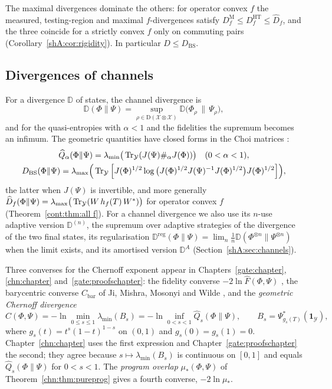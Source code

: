 The maximal divergences dominate the others: for operator convex $f$ the measured, testing-region and maximal $f$-divergences satisfy $D^{\mathrm M}_f\le D^{\mathrm{HT}}_f\le\widehat D_f$, and the three coincide for a strictly convex $f$ only on commuting pairs (Corollary~\ref{shA:cor:rigidity}). In particular $D\le D_{\mathrm{BS}}$.

\subsection*{Divergences of channels}
For a divergence $\mathbb D$ of states, the channel divergence is
\[
\mathbb D(\Phi\|\Psi)=\sup_{\rho\in\mathrm D(\mathcal X\otimes\mathcal X)}\mathbb D\big(\Phi_\rho\,\big\|\,\Psi_\rho\big),
\]
and for the quasi-entropies with $\alpha<1$ and the fidelities the supremum becomes an infimum. The geometric quantities have closed forms in the Choi matrices \cite{KatariyaWilde2021,FangFawzi2021}:
\begin{gather*}
\widehat Q_\alpha(\Phi\|\Psi)=\lambda_{\min}\big(\operatorname{Tr}_{\mathcal Y}(J(\Psi)\#_\alpha J(\Phi))\big)\quad(0<\alpha<1),\\
D_{\mathrm{BS}}(\Phi\|\Psi)=\lambda_{\max}\Big(\operatorname{Tr}_{\mathcal Y}\Big[J(\Phi)^{1/2}\log\big(J(\Phi)^{1/2}J(\Psi)^{-1}J(\Phi)^{1/2}\big)J(\Phi)^{1/2}\Big]\Big),
\end{gather*}
the latter when $J(\Psi)$ is invertible, and more generally $\widehat D_f(\Phi\|\Psi)=\lambda_{\max}\big(\operatorname{Tr}_{\mathcal Y}(W\,h_f(T)\,W^*)\big)$ for operator convex $f$ (Theorem~\ref{cont:thm:all f}). For a channel divergence we also use its $n$-use adaptive version $\mathbb D^{(n)}$, the supremum over adaptive strategies of the divergence of the two final states, its regularisation $\mathbb D^{\mathrm{reg}}(\Phi\|\Psi)=\lim_n\frac1n\mathbb D(\Phi^{\otimes n}\|\Psi^{\otimes n})$ when the limit exists, and its amortised version $\mathbb D^{A}$ \cite{WBHK2020} (Section~\ref{shA:sec:channels}).

Three converses for the Chernoff exponent appear in Chapters~\ref{gate:chapter}, \ref{chn:chapter} and~\ref{gate:proofschapter}: the fidelity converse $-2\ln\widehat F(\Phi,\Psi)$ \cite{KatariyaWilde2021}, the barycentric converse $C_{\mathrm{bar}}$ of Ji, Mishra, Mosonyi and Wilde \cite{JMMW2024}, and the \emph{geometric Chernoff divergence}
\[
\widehat C(\Phi,\Psi)=-\ln\min_{0\le s\le1}\lambda_{\min}(B_s)=-\ln\inf_{0<s<1}\widehat Q_s(\Phi\|\Psi),\qquad B_s=\Psi_{g_s(T)}^*(\mathbf 1_{\mathcal Y}),
\]
where $g_s(t)=t^s(1-t)^{1-s}$ on $(0,1)$ and $g_s(0)=g_s(1)=0$. Chapter~\ref{chn:chapter} uses the first expression and Chapter~\ref{gate:proofschapter} the second; they agree because $s\mapsto\lambda_{\min}(B_s)$ is continuous on $[0,1]$ and equals $\widehat Q_s(\Phi\|\Psi)$ for $0<s<1$. The \emph{program overlap} $\mu_*(\Phi,\Psi)$ of Theorem~\ref{chn:thm:pureprog} gives a fourth converse, $-2\ln\mu_*$.

